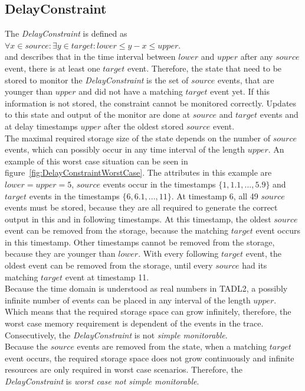 \subsection{DelayConstraint}
	\label{monitorability_DelayConstraint}
	The \emph{DelayConstraint} is defined as\\[10pt]
	\begin{math}
		\forall x\in source:\exists y\in target: lower\leq y-x\leq upper.
	\end{math}\\[10pt]
	and describes that in the time interval between $lower$ and $upper$ after any $source$ event, there is at least one $target$ event. Therefore, the state that need to be stored to monitor the \emph{DelayConstraint} is the set of $source$ events, that are younger than $upper$ and did not have a matching $target$ event yet. If this information is not stored, the constraint cannot be monitored correctly. Updates to this state and output of the monitor are done at $source$ and $target$ events and at delay timestamps $upper$ after the oldest stored $source$ event.\\
	The maximal required storage size of the state depends on the number of $source$ events, which can possibly occur in any time interval of the length $upper$. An example of this worst case situation can be seen in figure~\ref{fig:DelayConstraintWorstCase}. The attributes in this example are $lower=upper=5$, $source$ events occur in the timestamps $\{1, 1.1, ..., 5.9\}$ and $target$ events in the timestamps $\{6, 6.1, ..., 11\}$. At timestamp 6, all 49 $source$ events must be stored, because they are all required to generate the correct output in this and in following timestamps. At this timestamp, the oldest $source$ event can be removed from the storage, because the matching $target$ event occurs in this timestamp. Other timestamps cannot be removed from the storage, because they are younger than $lower$. With every following $target$ event, the oldest event can be removed from the storage, until every $source$ had its matching $target$ event at timestamp 11.\\
	Because the time domain is understood as real numbers in TADL2, a possibly infinite number of events can be placed in any interval of the length $upper$. Which means that the required storage space can grow infinitely, therefore, the worst case memory requirement is dependent of the events in the trace. Consecutively, the \textit{DelayConstraint} is not \textit{simple monitorable}.\\
	Because the $source$ events are removed from the state, when a matching $target$ event occurs, the required storage space does not grow continuously and infinite resources are only required in worst case scenarios. Therefore, the \emph{DelayConstraint} is \emph{worst case not simple monitorable}.
